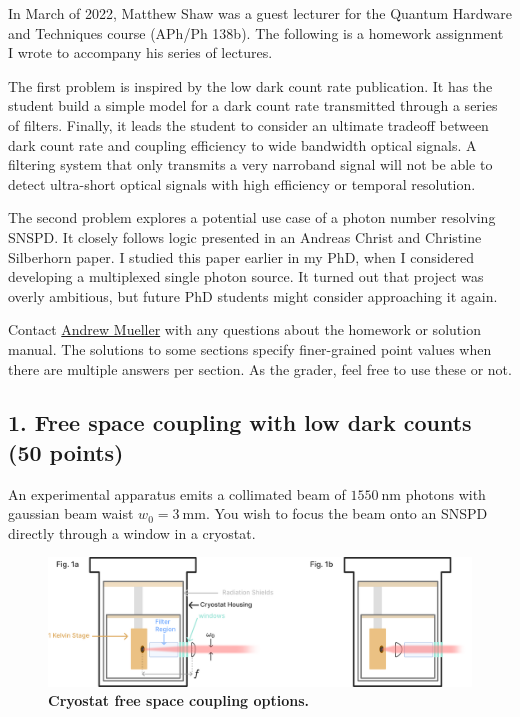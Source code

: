 \documentclass[12pt]{caltech_thesis}
\begin{document}
In March of 2022, Matthew Shaw was a guest lecturer for the Quantum
Hardware and Techniques course (APh/Ph 138b). The following is a
homework assignment I wrote to accompany his series of lectures.

The first problem is inspired by the low dark count rate
publication\autocite{Mueller:21}. It has the student build a simple
model for a dark count rate transmitted through a series of filters.
Finally, it leads the student to consider an ultimate tradeoff between
dark count rate and coupling efficiency to wide bandwidth optical
signals. A filtering system that only transmits a very narroband signal
will not be able to detect ultra-short optical signals with high
efficiency or temporal resolution.

The second problem explores a potential use case of a photon number
resolving SNSPD. It closely follows logic presented in an Andreas Christ
and Christine Silberhorn paper\autocite{Andreas:12}. I studied this
paper earlier in my PhD, when I considered developing a multiplexed
single photon source. It turned out that project was overly ambitious,
but future PhD students might consider approaching it again.

{\color{midnightblue} Contact
\href{mailto:andrewstermueller@gmail.com}{Andrew Mueller} with any
questions about the homework or solution manual. The solutions to some
sections specify finer-grained point values when there are multiple
answers per section. As the grader, feel free to use these or not. }

\hypertarget{free-space-coupling-with-low-dark-counts-50-points}{%
\subsection{1. Free space coupling with low dark counts (50
points)}\label{free-space-coupling-with-low-dark-counts-50-points}}

An experimental apparatus emits a collimated beam of
\(1550~\mathrm{nm}\) photons with gaussian beam waist
\(w_0 = 3~\mathrm{mm}\). You wish to focus the beam onto an SNSPD
directly through a window in a cryostat.

\hypertarget{fig:cryostat_concept}{%
\begin{figure}
\centering
\includegraphics{chapter_05/figs_05/fig1b_light.pdf}
\caption[{Cryostat optical coupling}]{\textbf{Cryostat free space
coupling options.}}
\label{fig:cryostat_concept}
\end{figure}
}
\end{document}
